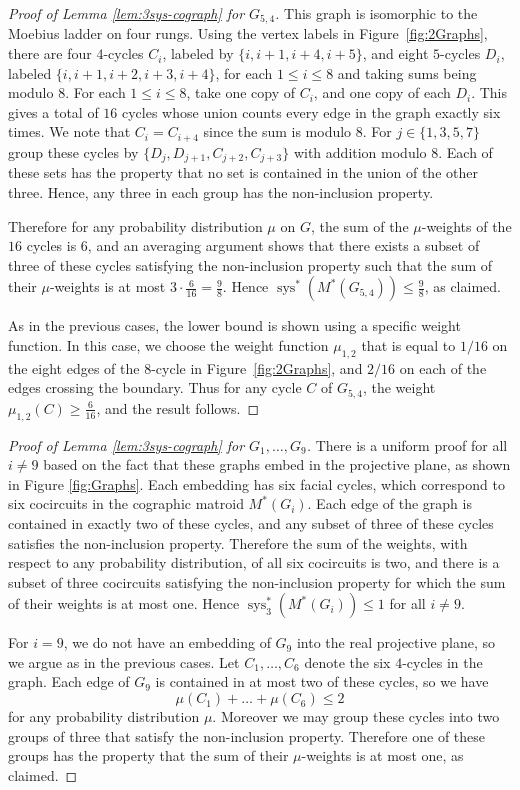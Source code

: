 \documentclass[reqno,12pt]{amsart}
\numberwithin{theorem}{section}
\theoremstyle{plain}
\theoremstyle{definition}
\theoremstyle{remark}
\numberwithin{equation}{section}
\numberwithin{table}{section}
\DeclareMathOperator{\sys}{sys}
\begin{document}
\begin{proof}[Proof of Lemma \ref{lem:3sys-cograph} for $G_{5,4}$]
This graph is isomorphic to the Moebius ladder on four rungs. Using the vertex labels in Figure~\ref{fig:2Graphs}, there are four $4$-cycles $C_i$, labeled by $\{i,i+1,i+4,i+5\}$, and eight $5$-cycles $D_i$, labeled $\{i,i+1,i+2,i+3,i+4\}$, for each $1 \leq i \leq 8$ and taking sums being modulo 8. For each $1 \leq i \leq 8$, take one copy of $C_i$, and one copy of each $D_i$. This gives a total of $16$ cycles whose union counts every edge in the graph exactly six times. We note that $C_i=C_{i+4}$ since the sum is modulo 8. For $j\in\{1,3,5,7\}$ group these cycles by $\{D_j,D_{j+1},C_{j+2},C_{j+3}\}$ with addition modulo 8. Each of these sets has the property that no set is contained in the union of the other three. Hence, any three in each group has the non-inclusion property. 

Therefore for any probability distribution $\mu$ on $G$, the sum of the $\mu$-weights of the $16$ cycles is $6$, and an averaging argument shows that there exists a subset of three of these cycles satisfying the non-inclusion property such that the sum of their $\mu$-weights is at most $3\cdot\tfrac{6}{16} = \tfrac{9}{8}$. Hence $\sys^*(M^*(G_{5,4})) \leq \tfrac 9 8$, as claimed.

As in the previous cases, the lower bound is shown using a specific weight function. In this case, we choose the weight function $\mu_{1,2}$ that is equal to $1/16$ on the eight edges of the 8-cycle in Figure~\ref{fig:2Graphs}, and $2/16$ on each of the edges crossing the boundary. Thus for any cycle $C$ of $G_{5,4}$, the weight $\mu_{1,2}(C)\geq \tfrac 6 {16}$, and the result follows. 
\end{proof}

\begin{proof}[Proof of Lemma \ref{lem:3sys-cograph} for $G_1,\ldots,G_9$]
There is a uniform proof for all $i \neq 9$ based on the fact that these graphs embed in the projective plane, as shown in Figure \ref{fig:Graphs}. Each embedding has six facial cycles, which correspond to six cocircuits in the cographic matroid $M^*(G_i)$. Each edge of the graph is contained in exactly two of these cycles, and any subset of three of these cycles satisfies the non-inclusion property. Therefore the sum of the weights, with respect to any probability distribution, of all six cocircuits is two, and there is a subset of three cocircuits satisfying the non-inclusion property for which the sum of their weights is at most one. Hence $\sys_3^*(M^*(G_i)) \leq 1$ for all $i \neq 9$.

For $i = 9$, we do not have an embedding of $G_9$ into the real projective plane, so we argue as in the previous cases. Let $C_1, \ldots, C_6$ denote the six $4$-cycles in the graph. Each edge of $G_9$ is contained in at most two of these cycles, so we have
    \[\mu(C_1) + \ldots + \mu(C_6) \leq 2\]
for any probability distribution $\mu$. Moreover we may group these cycles into two groups of three that satisfy the non-inclusion property. Therefore one of these groups has the property that the sum of their $\mu$-weights is at most one, as claimed.
\end{proof}
\end{document}
